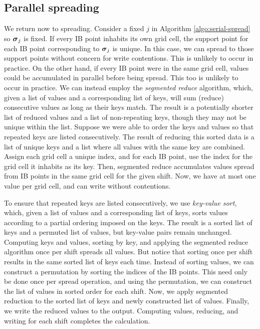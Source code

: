 \subsection{Parallel spreading}

We return now to spreading. Consider a fixed $j$ in Algorithm \ref{algo:serial-spread}
so $\boldsymbol{\sigma}_j$ is fixed. If every IB point inhabits its own grid cell, the support point
for each IB point corresponding to $\boldsymbol{\sigma}_j$ is unique. In this case, we can spread to
those support points without concern for write contentions. This is unlikely to occur in
practice. On the other hand, if every IB point were in the same grid cell, values could
be accumulated in parallel before being spread. This too is unlikely to occur in
practice. We can instead employ the \emph{segmented reduce} algorithm, which, given a
list of values and a corresponding list of keys, will sum (reduce) consecutive values as
long as their keys match. The result is a potentially shorter list of reduced values and
a list of non-repeating keys, though they may not be unique within the list. Suppose we
were able to order the keys and values so that repeated keys are listed consecutively.
The result of reducing this sorted data is a list of unique keys and a list where all
values with the same key are combined. Assign each grid cell a unique index, and for each
IB point, use the index for the grid cell it inhabits as its key. Then, segmented reduce
accumulates values spread from IB points in the same grid cell for the given shift. Now,
we have at most one value per grid cell, and can write without contentions.

To ensure that repeated keys are listed consecutively, we use \emph{key-value sort},
which, given a list of values and a corresponding list of keys, sorts values according to
a partial ordering imposed on the keys. The result is a sorted list of keys and a
permuted list of values, but key-value pairs remain unchanged. Computing keys and values,
sorting by key, and applying the segmented reduce algorithm once per shift spreads all
values.  But notice that sorting once per shift results in the same sorted list of keys
each time.  Instead of sorting values, we can construct a permutation by sorting the
indices of the IB points. This need only be done once per spread operation, and using the
permutation, we can construct the list of values in sorted order for each shift. Now, we
apply segmented reduction to the sorted list of keys and newly constructed list of
values.  Finally, we write the reduced values to the output. Computing values, reducing,
and writing for each shift completes the calculation.

